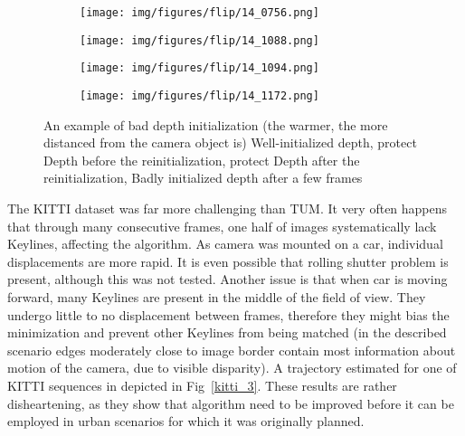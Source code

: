 \begin{figure}[ht]
	\centering
	\begin{subfigure}{1\textwidth}
		\centering
		\centering\texttt{[image: img/figures/flip/14\_0756.png]}
		\subcaption{\label{fig:teddyfirst}}
	\end{subfigure}
	\begin{subfigure}{1\textwidth}
		\centering
		\centering\texttt{[image: img/figures/flip/14\_1088.png]}
		\subcaption{\label{fig:teddybefore}}
	\end{subfigure}
	\begin{subfigure}{1\textwidth}
		\centering
		\centering\texttt{[image: img/figures/flip/14\_1094.png]}
		\subcaption{\label{fig:teddyafter}}
	\end{subfigure}
	\begin{subfigure}{1\textwidth}
		\centering
		\centering\texttt{[image: img/figures/flip/14\_1172.png]}
		\subcaption{\label{fig:teddylast}}
	\end{subfigure}
	\caption{\label{fig:teddyflip} An example of bad depth initialization (the warmer, the more distanced from the camera object is) \protect{} Well-initialized depth, protect Depth before the reinitialization, protect Depth after the reinitialization,
		\protect{} Badly initialized depth after a few frames}
\end{figure}

The KITTI dataset was far more challenging than TUM. It very often happens that through many consecutive frames, one half of images systematically lack Keylines, affecting the algorithm. As camera was mounted on a car, individual displacements are more rapid. It is even possible that rolling shutter problem is present, although this was not tested. Another issue is that when car is moving forward, many Keylines are present in the middle of the field of view. They undergo little to no displacement between frames, therefore they might bias the minimization and prevent other Keylines from being matched (in the described scenario edges moderately close to image border contain most information about motion of the camera, due to visible disparity). A trajectory estimated for one of KITTI sequences in depicted in Fig~\ref{kitti_3}. These results are rather disheartening, as they show that algorithm need to be improved before it can be employed in urban scenarios for which it was originally planned.



